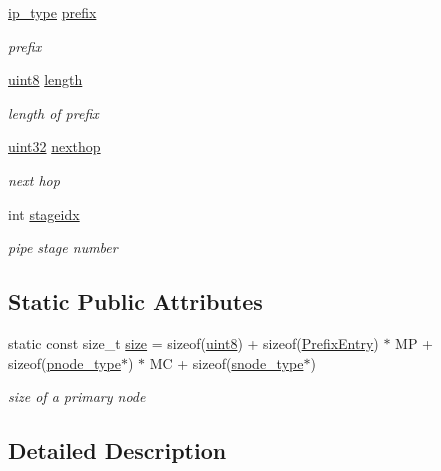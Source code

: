 \begin{DoxyCompactItemize}
\hyperlink{structPNode_a61bb3b468d24d7a913120fffd4b4cb26}{ip\-\_\-type} \hyperlink{structPNode_a801a5a133c2b7e0546c00dda35626ead}{prefix}
\begin{DoxyCompactList}\small\item\em prefix \end{DoxyCompactList}\item 
\hyperlink{types_8h_a34ecedcf03a70dc91e4616212d79267d}{uint8} \hyperlink{structPNode_a232325e635212db779b726f16959f238}{length}
\begin{DoxyCompactList}\small\item\em length of prefix \end{DoxyCompactList}\item 
\hyperlink{types_8h_abd01e8e67e3d94cab04ecaaf4f85ac1b}{uint32} \hyperlink{structPNode_a605054fd7e6a758e489ccfaaf71dcbc3}{nexthop}
\begin{DoxyCompactList}\small\item\em next hop \end{DoxyCompactList}\item 
int \hyperlink{structPNode_a7da0a256b28772769fa663846dc6ba0e}{stageidx}
\begin{DoxyCompactList}\small\item\em pipe stage number \end{DoxyCompactList}\end{DoxyCompactItemize}
\subsection*{Static Public Attributes}
\begin{DoxyCompactItemize}
\item 
static const size\-\_\-t \hyperlink{structPNode_a03fb09f6c82e9d2a8f4367758c767abc}{size} = sizeof(\hyperlink{types_8h_a34ecedcf03a70dc91e4616212d79267d}{uint8}) + sizeof(\hyperlink{structPNode_1_1PrefixEntry}{Prefix\-Entry}) $\ast$ M\-P + sizeof(\hyperlink{structPNode_a9f0e0153a9ff0faff3baa323c601f03a}{pnode\-\_\-type}$\ast$) $\ast$ M\-C + sizeof(\hyperlink{structPNode_a7d5f0e3af582a8c9f59a479f99a6ac09}{snode\-\_\-type}$\ast$)
\begin{DoxyCompactList}\small\item\em size of a primary node \end{DoxyCompactList}\end{DoxyCompactItemize}


\subsection{Detailed Description}
